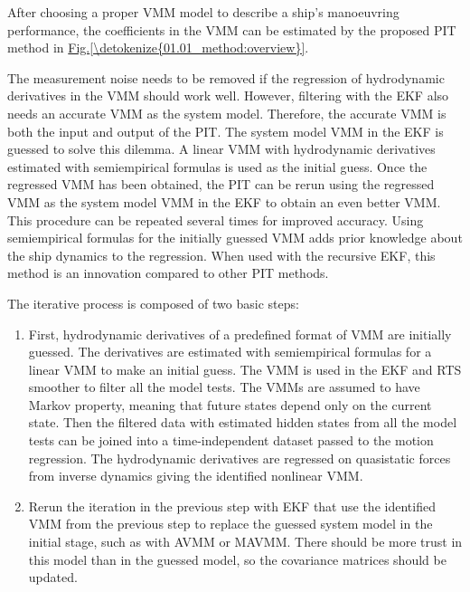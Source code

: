 \documentclass[review]{elsarticle}
\begin{document}
After choosing a proper VMM model to describe a ship’s manoeuvring performance, the coefficients in the VMM can be estimated by the proposed PIT method in \hyperref[\detokenize{01.01_method:overview}]{Fig.\@ \ref{\detokenize{01.01_method:overview}}}.

The measurement noise needs to be removed if the regression of hydrodynamic derivatives in the VMM should work well. However, filtering with the EKF also needs an accurate VMM as the system model. Therefore, the accurate VMM is both the input and output of the PIT. The system model VMM in the EKF is guessed to solve this dilemma. A linear VMM with hydrodynamic derivatives estimated with semi\sphinxhyphen{}empirical formulas is used as the initial guess. Once the regressed VMM has been obtained, the PIT can be rerun using the regressed VMM as the system model VMM in the EKF to obtain an even better VMM. This procedure can be repeated several times for improved accuracy. Using semi\sphinxhyphen{}empirical formulas for the initially guessed VMM adds prior knowledge about the ship dynamics to the regression. When used with the recursive EKF, this method is an innovation compared to other PIT methods.

  
The iterative process is composed of two basic steps:
\begin{enumerate}
%
\item {} 
  
First, hydrodynamic derivatives of a predefined format of VMM are initially guessed. The derivatives are estimated with semi\sphinxhyphen{}empirical formulas for a linear VMM to make an initial guess. The VMM is used in the EKF and RTS smoother to filter all the model tests. The VMMs are assumed to have Markov property, meaning that future states depend only on the current state. Then the filtered data with estimated hidden states from all the model tests can be joined into a time-independent dataset passed to the motion regression. The hydrodynamic derivatives are regressed on quasi\sphinxhyphen{}static forces from inverse dynamics giving the identified nonlinear VMM.

\item {} 
  
Re\sphinxhyphen{}run the iteration in the previous step with EKF that use the identified VMM from the previous step to replace the guessed system model in the initial stage, such as with AVMM or MAVMM. There should be more trust in this model than in the guessed model, so the covariance matrices should be updated.

\end{enumerate}
\end{document}
